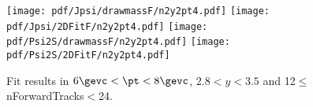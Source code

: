 \begin{figure}[H]
\begin{center}
\texttt{[image: pdf/Jpsi/drawmassF/n2y2pt4.pdf]}
\texttt{[image: pdf/Jpsi/2DFitF/n2y2pt4.pdf]}
\vspace*{-0.5cm}
\texttt{[image: pdf/Psi2S/drawmassF/n2y2pt4.pdf]}
\texttt{[image: pdf/Psi2S/2DFitF/n2y2pt4.pdf]}
\vspace*{-0.5cm}
\end{center}
\caption{Fit results in $6\gevc<\pt<8\gevc$, $2.8<y<3.5$ and 12$\leq$nForwardTracks$<$24.}
\label{Fitn2y2pt4}
\end{figure}
